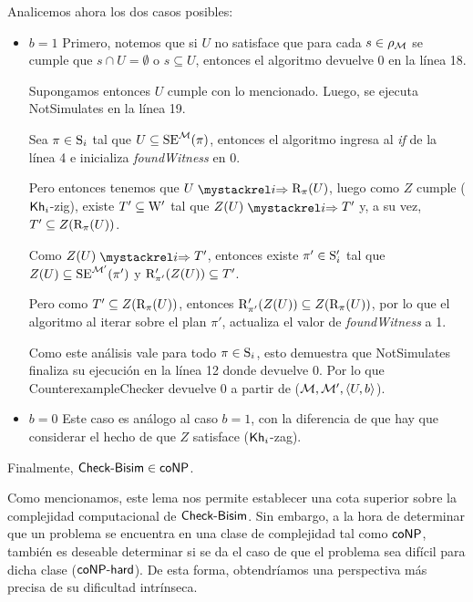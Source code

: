 \begin{demostracion}
\begin{itemize}
        Analicemos ahora los dos casos posibles:

        \begin{itemize}
            \item $b = 1$
                Primero, notemos que si $U$ no satisface que para cada $s \in \rho_\model$ se cumple que $s \cap U = \emptyset$ 
                o $s \subseteq U$, entonces el algoritmo devuelve 0 en la línea 18.

                Supongamos entonces $U$ cumple con lo mencionado. Luego, se ejecuta \textsf{NotSimulates} en la línea 19. 
                
                Sea $\pi \in \S_i$ tal que $U \subseteq \sexec^{\model}(\pi)$, 
                entonces el algoritmo ingresa al \textit{if} de la línea 4 e inicializa \textit{foundWitness} en 0.
                
                Pero entonces tenemos que $U \ultsExecAgi \R_\pi(U)$, luego como $Z$ cumple ($\khi$-zig), existe 
                $T' \subseteq \W'$ tal que $Z(U) \ultsExecAgi T'$ y, a su vez, $T' \subseteq Z(\R_\pi(U))$.
                
                Como $Z(U) \ultsExecAgi T'$, entonces existe $\pi' \in \S_i'$ tal que $Z(U) \subseteq \sexec^{\model'}(\pi')$ y 
                $\R'_{\pi'}(Z(U)) \subseteq T'$.
                
                Pero como $T' \subseteq Z(\R_\pi(U))$, entonces $\R'_{\pi'}(Z(U)) \subseteq Z(\R_\pi(U))$, por lo que 
                el algoritmo al iterar sobre el plan $\pi'$, actualiza el valor de \textit{foundWitness} a 1.
                
                Como este análisis vale para todo $\pi \in \S_i$, esto demuestra que \textsf{NotSimulates} finaliza su ejecución en la 
                línea 12 donde devuelve 0. Por lo que \textsf{CounterexampleChecker} devuelve 0 a partir de ($\modults,\modults',\tup{U,b}$).
            \item $b = 0$
                Este caso es análogo al caso $b = 1$, con la diferencia de que hay que considerar el hecho de que 
                $Z$ satisface ($\khi$-zag).
        \end{itemize}

    \end{itemize}
    Finalmente, $\CBisim \in \coNP$.
\end{demostracion}

Como mencionamos, este lema nos permite establecer una cota superior sobre la complejidad computacional de $\CBisim$. 
Sin embargo, a la hora de determinar que un problema se encuentra en una clase de complejidad tal como $\coNP$, también es deseable 
determinar si se da el caso de que el problema sea difícil para dicha clase ($\coNPHard$). De esta forma, obtendríamos una 
perspectiva más precisa de su dificultad intrínseca.

